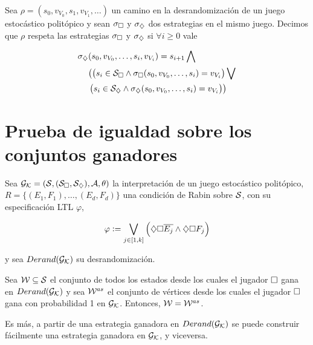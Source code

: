 Sea $\rho = (s_0, v_{V_0}, s_1, v_{V_1}, \dots)$ un camino en la
desrandomización de un juego estocástico politópico y sean $\sigma_\square$ y
$\sigma_\diamondsuit$ dos estrategias en el mismo juego. Decimos que $\rho$ respeta
las estrategias $\sigma_\square$ y $\sigma_\diamondsuit$ si $\forall i \geq 0$ vale

\begin{align*}
	\sigma_\diamondsuit&(s_0, v_{V_0}, \dots, s_i, v_{V_i})=s_{i+1} \bigwedge \\
	&\bigl( \left( s_i \in \mathcal{S}_\square \wedge \sigma_\square(s_0, v_{V_0}, \dots, s_i)=v_{V_i} \right) \bigvee \\
	&\left( s_i \in \mathcal{S}_\diamondsuit \wedge \sigma_\diamondsuit(s_0, v_{V_0}, \dots, s_i)=v_{V_i} \right) \bigr)
\end{align*}

\section{Prueba de igualdad sobre los conjuntos ganadores}

\begin{theorem}
	\label{teocuali}
	Sea $\mathcal{G}_{\mathcal{K}} = (\mathcal{S}, (\mathcal{S}_\square, \mathcal{S}_\diamondsuit), \mathcal{A}, \theta)$ la interpretación de un juego estocástico politópico, $R = \{(E_1, F_1), \dots, (E_d, F_d)\}$ una condición de Rabin sobre $\mathcal{S}$, con su especificación LTL $\varphi$,

	$$
		\varphi := \bigvee_{j \in [1, k]} \left( \diamondsuit \square \overline{E_j} \wedge \diamondsuit \square F_j \right)
	$$

	y sea $Derand(\mathcal{G}_{\mathcal{K}})$ su desrandomización.

	Sea $\mathcal{W} \subseteq \mathcal{S}$ el conjunto de todos los estados desde los cuales el
	jugador $\square$ gana en $Derand(\mathcal{G}_{\mathcal{K}})$ y sea $\mathcal{W}^{as}$ el conjunto de vértices desde
	los cuales el jugador $\square$ gana con probabilidad 1 en $\mathcal{G}_{\mathcal{K}}$. Entonces, $\mathcal{W} =
		\mathcal{W}^{as}$.

	Es más, a partir de una estrategia ganadora en $Derand(\mathcal{G}_{\mathcal{K}})$ se puede construir
	fácilmente una estrategia ganadora en $\mathcal{G}_{\mathcal{K}}$, y viceversa.
\end{theorem}

